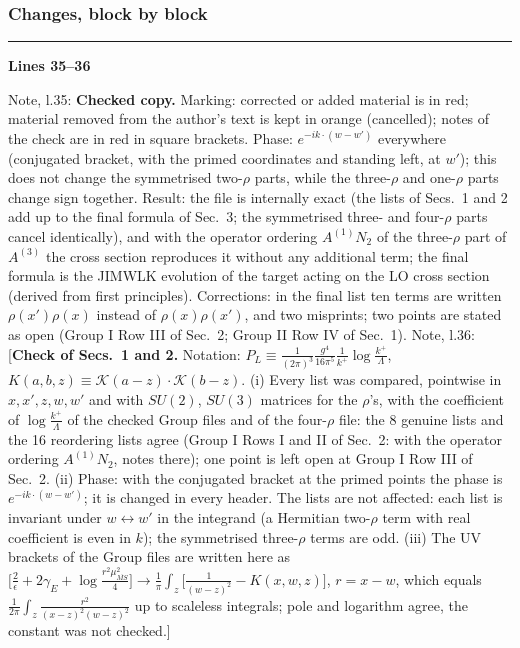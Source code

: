 \documentclass[10pt]{article}
\newenvironment{notebox}{\def\FrameCommand{{\color{notebar}\vrule width 1.5pt}\hspace{6pt}}\MakeFramed{\advance\hsize-\width\FrameRestore}\small}{\endMakeFramed}
\begin{document}
\subsubsection*{Changes, block by block}
\noindent\rule{\linewidth}{0.3pt}\par\noindent\textbf{Lines 35--36}\par
\begin{notebox}\textsf{\small Note, l.35:} \textbf{Checked copy.} Marking: corrected or added material is in red; material removed from the author's text is kept in orange (cancelled); notes of the check are in red in square brackets. Phase: $e^{-ik\cdot(w-w')}$ everywhere (conjugated bracket, with the primed coordinates and standing left, at $w'$); this does not change the symmetrised two-$\rho$ parts, while the three-$\rho$ and one-$\rho$ parts change sign together. Result: the file is internally exact (the lists of Secs.~1 and 2 add up to the final formula of Sec.~3; the symmetrised three- and four-$\rho$ parts cancel identically), and with the operator ordering $A^{(1)}N_{2}$ of the three-$\rho$ part of $A^{(3)}$ the cross section reproduces it without any additional term; the final formula is the JIMWLK evolution of the target acting on the LO cross section (derived from first principles). Corrections: in the final list ten terms are written $\rho(x')\rho(x)$ instead of $\rho(x)\rho(x')$, and two misprints; two points are stated as open (Group I Row III of Sec.~2; Group II Row IV of Sec.~1).\end{notebox}
\begin{notebox}\textsf{\small Note, l.36:} [\textbf{Check of Secs.~1 and 2.} Notation: $P_{L}\equiv\frac{1}{(2\pi)^{3}}\frac{g^{4}}{16\pi^{5}}\frac{1}{k^{+}}\log\frac{k^{+}}{\Lambda}$, $K(a,b,z)\equiv\mathcal{K}(a-z)\cdot\mathcal{K}(b-z)$. (i) Every list was compared, pointwise in $x,x',z,w,w'$ and with $SU(2)$, $SU(3)$ matrices for the $\rho$'s, with the coefficient of $\log\frac{k^{+}}{\Lambda}$ of the checked Group files and of the four-$\rho$ file: the 8 genuine lists and the 16 reordering lists agree (Group I Rows I and II of Sec.~2: with the operator ordering $A^{(1)}N_{2}$, notes there); one point is left open at Group I Row III of Sec.~2. (ii) Phase: with the conjugated bracket at the primed points the phase is $e^{-ik\cdot(w-w')}$; it is changed in every header. The lists are not affected: each list is invariant under $w\leftrightarrow w'$ in the integrand (a Hermitian two-$\rho$ term with real coefficient is even in $k$); the symmetrised three-$\rho$ terms are odd. (iii) The UV brackets of the Group files are written here as $\big[\frac{2}{\epsilon}+2\gamma_{E}+\log\frac{r^{2}\mu^{2}_{\overline{MS}}}{4}\big]\to\frac{1}{\pi}\int_{z}\big[\frac{1}{(w-z)^{2}}-K(x,w,z)\big]$, $r=x-w$, which equals $\frac{1}{2\pi}\int_{z}\frac{r^{2}}{(x-z)^{2}(w-z)^{2}}$ up to scaleless integrals; pole and logarithm agree, the constant was not checked.]\end{notebox}
\end{document}
